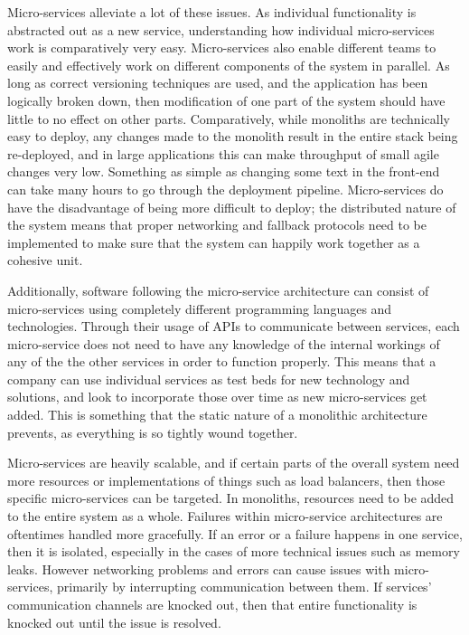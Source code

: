 Micro-services alleviate a lot of these issues. As individual functionality is abstracted out as a new service, understanding how individual micro-services work is comparatively very easy. Micro-services also enable different teams to easily and effectively work on different components of the system in parallel. As long as correct versioning techniques are used, and the application has been logically broken down, then modification of one part of the system should have little to no effect on other parts. Comparatively, while monoliths are technically easy to deploy, any changes made to the monolith result in the entire stack being re-deployed, and in large applications this can make throughput of small agile changes very low. Something as simple as changing some text in the front-end can take many hours to go through the deployment pipeline. Micro-services do have the disadvantage of being more difficult to deploy; the distributed nature of the system means that proper networking and fallback protocols need to be implemented to make sure that the system can happily work together as a cohesive unit.

Additionally, software following the micro-service architecture can consist of micro-services using completely different programming languages and technologies. Through their usage of APIs to communicate between services, each micro-service does not need to have any knowledge of the internal workings of any of the the other services in order to function properly. This means that a company can use individual services as test beds for new technology and solutions, and look to incorporate those over time as new micro-services get added. This is something that the static nature of a monolithic architecture prevents, as everything is so tightly wound together.

Micro-services are heavily scalable, and if certain parts of the overall system need more resources or implementations of things such as load balancers, then those specific micro-services can be targeted. In monoliths, resources need to be added to the entire system as a whole. Failures within micro-service architectures are oftentimes handled more gracefully. If an error or a failure happens in one service, then it is isolated, especially in the cases of more technical issues such as memory leaks. However networking problems and errors can cause issues with micro-services, primarily by interrupting communication between them. If services' communication channels are knocked out, then that entire functionality is knocked out until the issue is resolved.

